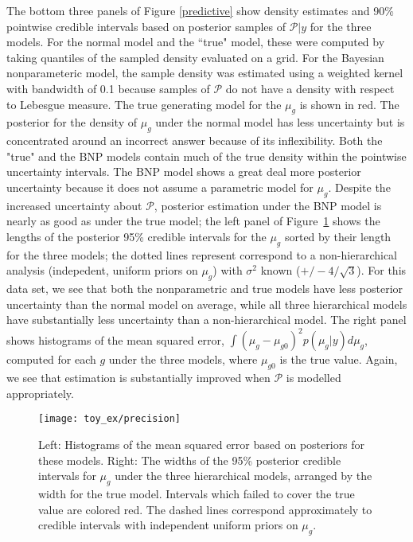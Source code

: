 The bottom three panels of Figure \ref{predictive} show density estimates and 90\% pointwise credible intervals based on posterior samples of $\mathcal{P}|y$ for the three models. For the normal model and the ``true" model, these were computed by taking quantiles of the sampled density evaluated on a grid. For the Bayesian nonparameteric model, the sample density was estimated using a weighted kernel with bandwidth of 0.1 because samples of $\mathcal{P}$ do not have a density with respect to Lebesgue measure. The true generating model for the $\mu_g$ is shown in red. The posterior for the density of $\mu_g$ under the normal model has less uncertainty but is concentrated around an incorrect answer because of its inflexibility. Both the "true" and the BNP models contain much of the true density within the pointwise uncertainty intervals. The BNP model shows a great deal more posterior uncertainty because it does not assume a parametric model for $\mu_g$. Despite the increased uncertainty about $\mathcal{P}$, posterior estimation under the BNP model is nearly as good as under the true model; the left panel of Figure~\ref{precision} shows the lengths of the posterior 95\% credible intervals for the $\mu_g$ sorted by their length for the three models; the dotted lines represent correspond to a non-hierarchical analysis (indepedent, uniform priors on $\mu_g$) with $\sigma^2$ known ($+/- 4/\sqrt{3}$). For this data set, we see that both the nonparametric and true models have less posterior uncertainty than the normal model on average, while all three hierarchical models have substantially less uncertainty than a non-hierarchical model. The right panel shows histograms of the mean squared error, $\int (\mu_g - \mu_{g0})^2 p(\mu_g|y) d\mu_g$, computed for each $g$ under the three models, where $\mu_{g0}$ is the true value. Again, we see that estimation is substantially improved when $\mathcal{P}$ is modelled appropriately.


\begin{figure}[h!]
\centering
\texttt{[image: toy\_ex/precision]}
\begin{minipage}{.7\textwidth}\small%
\caption{Left: Histograms of the mean squared error based on posteriors for these models. Right: The widths of the 95\% posterior credible intervals for $\mu_g$ under the three hierarchical models, arranged by the width for the true model. Intervals which failed to cover the true value are colored red. The dashed lines correspond approximately to credible intervals with independent uniform priors on $\mu_g$.}
\end{minipage}
\label{precision}
\end{figure}


